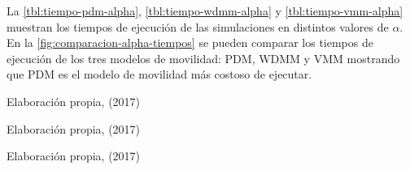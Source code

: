 La \ref{tbl:tiempo-pdm-alpha}, \ref{tbl:tiempo-wdmm-alpha} y
\ref{tbl:tiempo-vmm-alpha} muestran los tiempos de ejecución de las simulaciones
en distintos valores de $\alpha$. En la \ref{fig:comparacion-alpha-tiempos} se
pueden comparar los tiempos de ejecución de los tres modelos de movilidad: PDM,
WDMM y VMM mostrando que PDM es el modelo de movilidad más costoso de ejecutar.


{Elaboración propia, (2017)}


{Elaboración propia, (2017)}



{Elaboración propia, (2017)}






